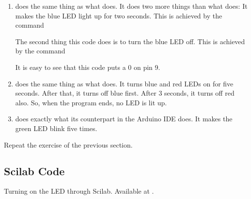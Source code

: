 \begin{enumerate}
  The last line in the code closes the serial port.  As mentioned
  above, it is extremely important to close the serial port properly.
  If not closed properly, there could be difficulties in running
  subsequent programs.

\item {} does the same thing as what
   does.  It does two more things than what
   does: It makes the blue LED light up for two
  seconds.  This is achieved by the command
  
  The second thing this code does is to turn the blue LED off.  This
  is achieved by the command
  
  It is easy to see that this code puts a 0 on pin 9.

\item {} does the same thing as what
   does.  It turns blue and red LEDs on for
  five seconds.  After that, it turns off blue first.  After 3
  seconds, it turns off red also.  So, when the program ends, no LED is
  lit up.

\item {} does exactly what its counterpart
  in the Arduino IDE does.  It makes the green LED blink five times.
\end{enumerate}

\begin{exercise}
Repeat the exercise of the previous section.
\end{exercise}

\subsection{Scilab Code}
\lstset{style=mystyle}
\label{sec:led-scilab-code}

\begin{scicode}
{Turning on the LED through Scilab.  Available at
  .}
\label{sci:led-blue}

\end{scicode}

\begin{scicode}
\label{sci:led-blue-delay}

\end{scicode}

